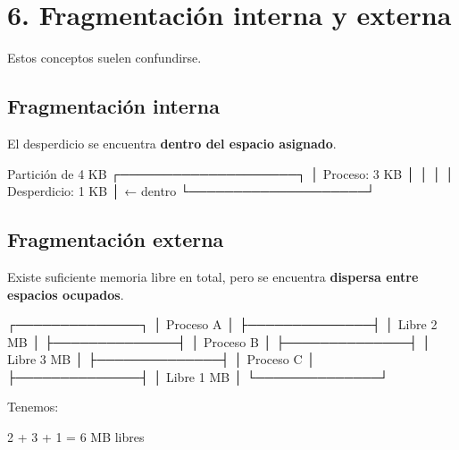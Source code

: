 \documentclass[
  spanish,
  letterpaper,
]{scrbook}
\newenvironment{Shaded}{\begin{snugshade}}{\end{snugshade}}
\newcommand{\NormalTok}[1]{\textcolor[rgb]{0.00,0.23,0.31}{#1}}
\begin{document}
\chapter{6. Fragmentación interna y
externa}\label{fragmentaciuxf3n-interna-y-externa}

Estos conceptos suelen confundirse.

\section{Fragmentación interna}\label{fragmentaciuxf3n-interna}

El desperdicio se encuentra \textbf{dentro del espacio asignado}.

\begin{Shaded}
\begin{Highlighting}[]
\NormalTok{Partición de 4 KB}
\NormalTok{┌────────────────────┐}
\NormalTok{│ Proceso: 3 KB      │}
\NormalTok{│                    │}
\NormalTok{│ Desperdicio: 1 KB  │ ← dentro}
\NormalTok{└────────────────────┘}
\end{Highlighting}
\end{Shaded}

\section{Fragmentación externa}\label{fragmentaciuxf3n-externa}

Existe suficiente memoria libre en total, pero se encuentra
\textbf{dispersa entre espacios ocupados}.

\begin{Shaded}
\begin{Highlighting}[]
\NormalTok{┌──────────────┐}
\NormalTok{│ Proceso A    │}
\NormalTok{├──────────────┤}
\NormalTok{│ Libre 2 MB   │}
\NormalTok{├──────────────┤}
\NormalTok{│ Proceso B    │}
\NormalTok{├──────────────┤}
\NormalTok{│ Libre 3 MB   │}
\NormalTok{├──────────────┤}
\NormalTok{│ Proceso C    │}
\NormalTok{├──────────────┤}
\NormalTok{│ Libre 1 MB   │}
\NormalTok{└──────────────┘}
\end{Highlighting}
\end{Shaded}

Tenemos:

\begin{Shaded}
\begin{Highlighting}[]
\NormalTok{2 + 3 + 1 = 6 MB libres}
\end{Highlighting}
\end{Shaded}
\end{document}
